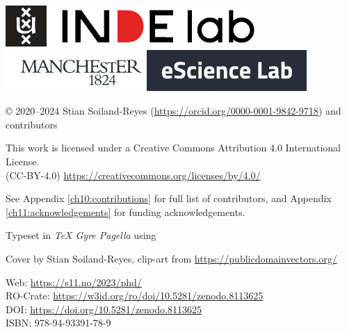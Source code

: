 \newpage

\vspace*{\fill}

\includegraphics{figures/indelab}\hspace{2em}
\includegraphics{figures/escienceLab-logo}

© 2020--2024 Stian Soiland-Reyes 
(\url{https://orcid.org/0000-0001-9842-9718})
and contributors

This work is licensed under a Creative Commons Attribution 4.0 International License. \\
(CC-BY-4.0) \url{https://creativecommons.org/licenses/by/4.0/}

See Appendix \ref{ch10:contributions} for full list of contributors, and Appendix \ref{ch11:acknowledgements} for funding acknowledgements.


Typeset in \emph{TeX Gyre Pagella} using \mybanner

Cover by Stian Soiland-Reyes, clip-art from \url{https://publicdomainvectors.org/}

Web: \url{https://s11.no/2023/phd/} \\
RO-Crate: \url{https://w3id.org/ro/doi/10.5281/zenodo.8113625}\\
DOI: \url{https://doi.org/10.5281/zenodo.8113625}\\
ISBN: 978-94-93391-78-9

\newpage
\thispagestyle{empty} 

